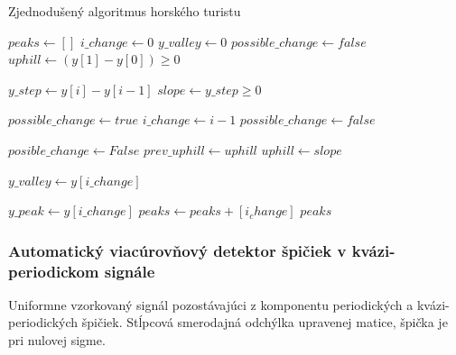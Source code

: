 \begin{algorithm}
\caption{Zjednodušený algoritmus horského turistu}
\begin{algorithmic}[1]
	\State $peaks \gets []$
	\State $i\_change \gets 0$
	\State $y\_valley \gets 0$
	\State $possible\_change \gets false$
	\State $uphill \gets (y[1] - y[0]) \geq 0$
	
		\State $y\_step \gets y[i] - y[i-1]$
        \State $slope \gets y\_step \geq 0$

        	\State $possible\_change \gets true$   
        	\State $i\_change \gets i - 1$
        	\State $possible\_change \gets false$  
        \EndIf
        

        	\State $posible\_change \gets False$
        	\State $prev\_uphill \gets uphill$
        	\State $uphill \gets slope$
        	
				\State $y\_valley \gets y[i\_change]$   
                
				\State $y\_peak \gets y[i\_change]$    
				\State $peaks \gets peaks + [i_change]$              
            \EndIf      	
        \EndIf       
	\EndFor
	\State \Return $peaks$
\EndFunction
\end{algorithmic}
\end{algorithm}

\subsubsection{Automatický viacúrovňový detektor špičiek v kvázi-periodickom signále}
Uniformne vzorkovaný signál pozostávajúci z komponentu periodických a kvázi-periodických špičiek. 
Stĺpcová smerodajná odchýlka upravenej matice, špička je pri nulovej sigme. \cite{ampd-algorithm}


